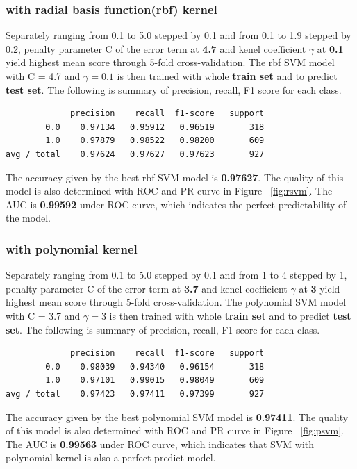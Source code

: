 \documentclass{article}
\begin{document}
\begin{singlespacing}
\subsubsection{with radial basis function(rbf) kernel}
Separately ranging from 0.1 to 5.0 stepped by 0.1 and from 0.1 to 1.9 stepped by 0.2, penalty parameter C of the error term at \textbf{4.7} and kenel coefficient $\gamma$ at \textbf{0.1} yield highest mean score through 5-fold cross-validation. The rbf SVM model with C = 4.7 and $\gamma = 0.1 $ is then trained with  whole \textbf{train set} and to predict \textbf{test set}. The following is summary of precision, recall, F1 score for each class.
\begin{lstlisting}
             precision    recall  f1-score   support
        0.0    0.97134   0.95912   0.96519       318
        1.0    0.97879   0.98522   0.98200       609
avg / total    0.97624   0.97627   0.97623       927
\end{lstlisting}
The accuracy given by the best rbf SVM model is \textbf{0.97627}. The quality of this model is also determined with ROC and PR curve in Figure ~\ref{fig:rsvm}. The AUC is \textbf{0.99592} under ROC curve, which indicates the perfect predictability of the model.

\subsubsection{with polynomial kernel}
Separately ranging from 0.1 to 5.0 stepped by 0.1 and from 1 to 4 stepped by 1, penalty parameter C of the error term at \textbf{3.7} and kenel coefficient $\gamma$ at \textbf{3} yield highest mean score through 5-fold cross-validation. The polynomial SVM model with C = 3.7 and $\gamma = 3 $ is then trained with  whole \textbf{train set} and to predict \textbf{test set}. The following is summary of precision, recall, F1 score for each class.
\begin{lstlisting}
             precision    recall  f1-score   support
        0.0    0.98039   0.94340   0.96154       318
        1.0    0.97101   0.99015   0.98049       609
avg / total    0.97423   0.97411   0.97399       927
\end{lstlisting}
The accuracy given by the best polynomial SVM model is \textbf{0.97411}. The quality of this model is also determined with ROC and PR curve in Figure ~\ref{fig:psvm}. The AUC is \textbf{0.99563} under ROC curve, which indicates that SVM with polynomial kernel is also a perfect predict model.


\end{singlespacing}
\end{document}
